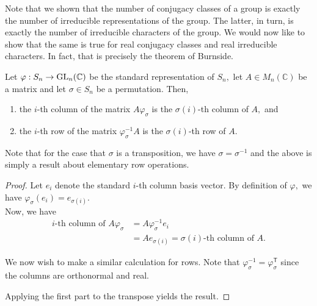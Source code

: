 Note that we shown that the number of conjugacy classes of a group is exactly the number of irreducible representations of the group. The latter, in turn, is exactly the number of irreducible characters of the group. We would now like to show that the same is true for real conjugacy classes and real irreducible characters. In fact, that is precisely the theorem of Burnside.

\begin{lem} \label{lem:rowcoloperations}
	Let $\varphi : S_n \to \operatorname{GL}_n(\mathbb{C})$ be the standard representation of $S_n,$ let $A \in M_n(\mathbb{C})$ be a matrix and let $\sigma \in S_n$ be a permutation. Then,
	\begin{enumerate}
		\item  the $i$-th column of the matrix $A\varphi_\sigma$ is the $\sigma(i)$-th column of $A,$ and
		\item the $i$-th row of the matrix $\varphi_\sigma^{-1}A$ is the $\sigma(i)$-th row of $A.$
	\end{enumerate}
\end{lem}
Note that for the case that $\sigma$ is a transposition, we have $\sigma = \sigma^{-1}$ and the above is simply a result about elementary row operations.
\begin{proof} 
	Let $e_i$ denote the standard $i$-th column basis vector. By definition of $\varphi,$ we have $\varphi_\sigma(e_i) = e_{\sigma(i)}.$ \\
	Now, we have
	\begin{align*} 
		i\text{-th column of }A\varphi_\sigma &= A\varphi_\sigma^{-1}e_i\\
		&= Ae_{\sigma(i)} = \sigma(i)\text{-th column of }A.
	\end{align*}
	
	We now wish to make a similar calculation for rows. Note that $\varphi_\sigma^{-1} = \varphi_\sigma^\mathsf{T}$ since the columns are orthonormal and real.

	Applying the first part to the transpose yields the result.
\end{proof}


